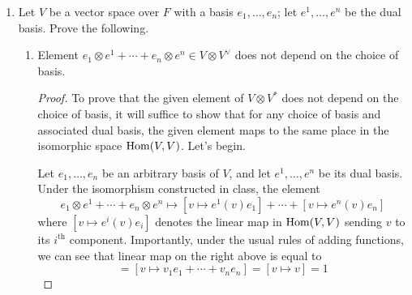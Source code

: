 \documentclass[../psets.tex]{subfiles}
\begin{document}
\begin{enumerate}
\begin{enumerate}
\begin{proof}
            \begin{align*}
                S^0(2,1) &= (3)\\
                S^1(2,1) &= (2,1)\\
                S^2(2,1) &= (2,1)\oplus(3)\\
                S^3(2,1) &= (2,1)\oplus(3)\oplus(1,1,1)\\
                S^4(2,1) &= (2,1)^2\oplus(3)\\
                S^5(2,1) &= (2,1)^2\oplus(3)\oplus(1,1,1)
            \end{align*}
            Therefore,
            \begin{equation*}
                \boxed{S^k(2,1) = S^{k\bmod 6}(2,1)\oplus R^{\lfloor k/6 \rfloor}}
            \end{equation*}
        \end{proof}
    \end{enumerate}
    \item Let $V$ be a vector space over $F$ with a basis $e_1,\dots,e_n$; let $e^1,\dots,e^n$ be the dual basis. Prove the following.
    \begin{enumerate}
        \item Element $e_1\otimes e^1+\cdots+e_n\otimes e^n\in V\otimes V^\vee$ does not depend on the choice of basis.
        \begin{proof}
            To prove that the given element of $V\otimes V^*$ does not depend on the choice of basis, it will suffice to show that for any choice of basis and associated dual basis, the given element maps to the same place in the isomorphic space $\operatorname{Hom}(V,V)$. Let's begin.\par
            Let $e_1,\dots,e_n$ be an arbitrary basis of $V$, and let $e^1,\dots,e^n$ be its dual basis. Under the isomorphism constructed in class, the element
            \begin{equation*}
                e_1\otimes e^1+\cdots+e_n\otimes e^n \mapsto [v\mapsto e^1(v)e_1]+\cdots+[v\mapsto e^n(v)e_n]
            \end{equation*}
            where $[v\mapsto e^i(v)e_i]$ denotes the linear map in $\operatorname{Hom}(V,V)$ sending $v$ to its $i^\text{th}$ component. Importantly, under the usual rules of adding functions, we can see that linear map on the right above is equal to
            \begin{equation*}
                [v\mapsto e^1(v)e_1+\cdots+e^n(v)e_n] = [v\mapsto v_1e_1+\cdots+v_ne_n] = [v\mapsto v] = 1
            \end{equation*}

\end{proof}
\end{enumerate}
\end{enumerate}
\end{document}
